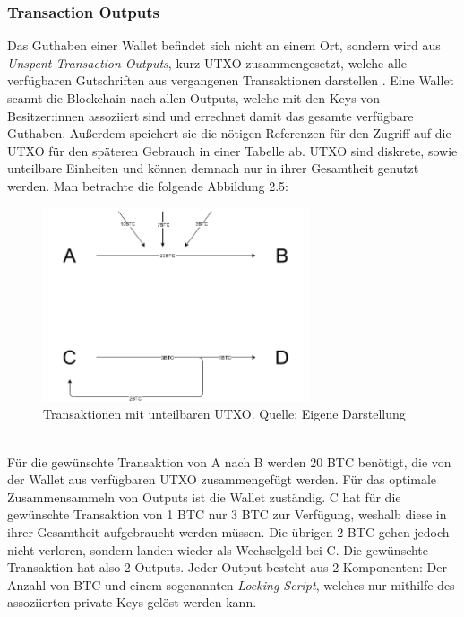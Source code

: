 \subsubsection{Transaction Outputs}
Das Guthaben einer Wallet befindet sich nicht an einem Ort, sondern wird aus \emph{Unspent Transaction Outputs}, kurz UTXO zusammengesetzt, welche alle verfügbaren Gutschriften aus vergangenen Transaktionen darstellen \cite[]{antanopoulos_2014}.
Eine Wallet scannt die Blockchain nach allen Outputs, welche mit den Keys von Besitzer:innen assoziiert sind und errechnet damit das gesamte verfügbare Guthaben. Außerdem speichert sie die nötigen Referenzen für den Zugriff auf die UTXO für den späteren Gebrauch in einer Tabelle ab. UTXO sind diskrete, sowie unteilbare Einheiten und können demnach nur in ihrer Gesamtheit genutzt werden. Man betrachte die folgende Abbildung 2.5:
\begin{figure}[htpb]
	\centering
	\includegraphics[width=0.7\textwidth]{images/UTXO.png}
	\caption{Transaktionen mit unteilbaren UTXO.
	Quelle: Eigene Darstellung}
	\label{6braun:fig:Transaktionen}
\end{figure}\\
Für die gewünschte Transaktion von A nach B werden 20 BTC benötigt, die von der Wallet aus verfügbaren UTXO zusammengefügt werden. 
Für das optimale Zusammensammeln von Outputs ist die Wallet zuständig.
C hat für die gewünschte Transaktion von 1 BTC nur 3 BTC zur Verfügung, weshalb diese in ihrer Gesamtheit aufgebraucht werden müssen.
Die übrigen 2 BTC gehen jedoch nicht verloren, sondern landen wieder als Wechselgeld bei C. 
Die gewünschte Transaktion hat also 2 Outputs.
Jeder Output besteht aus 2 Komponenten: Der Anzahl von BTC und einem sogenannten \emph{Locking Script}, welches nur mithilfe des assoziierten private Keys gelöst werden kann.

